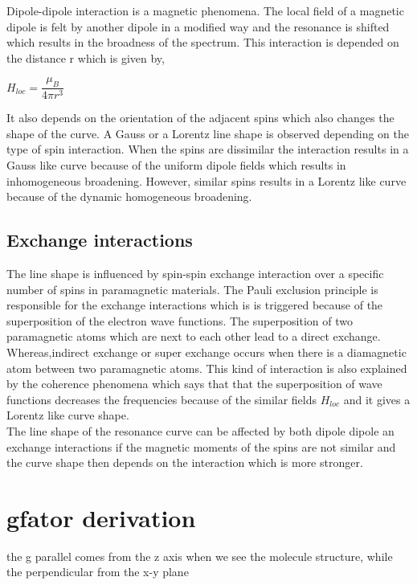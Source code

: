 \documentclass[openany,11pt,a4paper]{report}
\begin{document}
Dipole-dipole interaction is a magnetic phenomena. The local field of a magnetic dipole is felt by another dipole in a modified way and the resonance is shifted which results in the broadness of the spectrum. This interaction is depended on the distance r which is given by,
\begin{center}
$H_{loc}=\dfrac{\mu_{B}}{4 \pi r^{3}}$
\end{center}
It also depends on the orientation of the adjacent spins which also changes the shape of the curve. A Gauss or a Lorentz line shape is observed depending on the type of spin interaction. When the spins are dissimilar the interaction results in a Gauss like curve because of the uniform dipole fields which results in inhomogeneous broadening. However, similar spins results in a Lorentz like curve because of the dynamic homogeneous broadening.   
\\


\subsection{Exchange interactions}

The line shape is influenced by spin-spin exchange interaction over a specific number of spins in paramagnetic materials. The Pauli exclusion principle is responsible for the exchange interactions which is is triggered because of the superposition of the electron wave functions. The superposition of two paramagnetic atoms which are next to each other lead to a direct exchange. Whereas,indirect exchange or super exchange occurs when there is a diamagnetic atom between two paramagnetic atoms. This kind of interaction is also explained by the coherence phenomena which says that that the superposition of wave functions decreases the frequencies because of the similar fields $H_{loc}$ and it gives a Lorentz like curve shape.  \\


The line shape of the resonance curve can be affected by both dipole dipole an exchange interactions if the magnetic moments of the spins are not similar and the curve shape then depends on the interaction which is more stronger. 



\section{gfator derivation}

the g parallel comes from the z axis when we see the molecule structure, while the perpendicular from the x-y plane 
\end{document}
